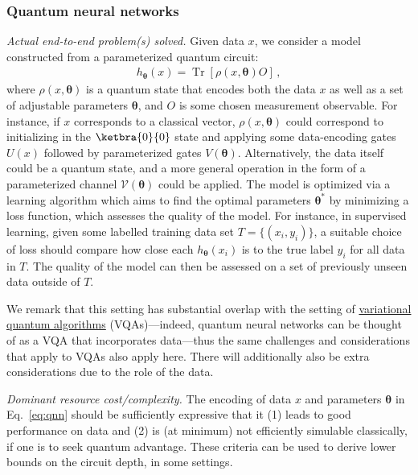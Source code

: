 \begin{refsection}
\subsubsection*{Quantum neural networks}

\textit{Actual end-to-end problem(s) solved.} Given data $x$, we consider a model constructed from a parameterized quantum circuit:
\begin{align}\label{eq:qnn}
    h_{\boldsymbol{\theta}}(x) = \operatorname{Tr}\left[ \rho(x, \boldsymbol{\theta} ) O\right]\,,
\end{align}
where $\rho(x, \boldsymbol{\theta} )$ is a quantum state that encodes both the data $x$ as well as a set of adjustable parameters $\boldsymbol{\theta}$, and $O$ is some chosen measurement observable.
For instance, if $x$ corresponds to a classical vector, $\rho(x, \boldsymbol{\theta} )$ could correspond to initializing in the $\ketbra{0}{0}$ state and applying some data-encoding gates $U(x)$ followed by parameterized gates $V(\boldsymbol{\theta})$. Alternatively, the data itself could be a quantum state, and a more general operation in the form of a parameterized channel $\mathcal{V}(\boldsymbol{\theta})$ could be applied. The model is optimized  via a learning algorithm which aims to find the optimal parameters $\boldsymbol{\theta}^*$ by minimizing a loss function, which assesses the quality of the model. For instance, in supervised learning, given some labelled training data set $T=\{(x_i, y_i)\}$, a suitable choice of loss should compare how close each $h_{\boldsymbol{\theta}}(x_i)$ is to the true label $y_i$ for all data in $T$. The quality of the model can then be assessed on a set of previously unseen data outside of $T$. 

We remark that this setting has substantial overlap with the setting of \hyperref[prim:VQA]{variational quantum algorithms} (VQAs)---indeed, quantum neural networks can be thought of as a VQA that incorporates data---thus the same challenges and considerations that apply to VQAs also apply here. There will additionally also be extra considerations due to the role of the data.

\textit{Dominant resource cost/complexity.} The encoding of data $x$ and parameters $\boldsymbol{\theta}$ in Eq.~\eqref{eq:qnn} should be sufficiently expressive that it (1) leads to good performance on data and (2) is (at minimum) not efficiently simulable classically, if one is to seek quantum advantage. These criteria can be used to derive lower bounds on the circuit depth, in some settings.


\end{refsection}
